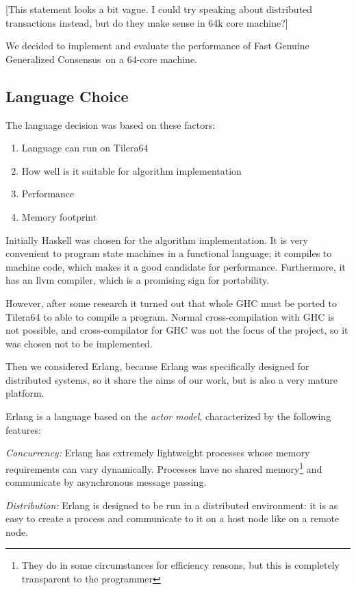 \documentclass[english,11pt]{article}
\newcommand{\fggc}{Fast Genuine Generalized Consensus\ }
\begin{document}
[This statement looks a bit vague. I could try speaking about distributed
transactions instead, but do they make sense in 64k core machine?]

We decided to implement and evaluate the performance of \fggc on a 64-core
machine.

\subsection{Language Choice}

The language decision was based on these factors:
\begin{enumerate}
    \item Language can run on Tilera64
    \item How well is it suitable for algorithm implementation
    \item Performance
    \item Memory footprint
\end{enumerate}

Initially Haskell was chosen for the algorithm implementation. It is very
convenient to program state machines in a functional language; it compiles to
machine code, which makes it a good candidate for performance. Furthermore, it
has an llvm compiler, which is a promising sign for portability.

However, after some research it turned out that whole GHC must be ported to
Tilera64 to able to compile a program. Normal cross-compilation with GHC is not
possible, and cross-compilator for GHC was not the focus of the project, so it
was chosen not to be implemented.

Then we considered Erlang, because Erlang was specifically designed for
distributed systems, so it share the aims of our work, but is also a very
mature platform.

Erlang is a language based on the  {\em actor model}, characterized by the
following features:

{\em Concurrency:} Erlang has extremely lightweight processes whose memory
requirements can vary dynamically. Processes have no shared
memory\footnote{They do in some circumstances for efficiency reasons, but this
is completely transparent to the programmer} and communicate by asynchronous
message passing. 

{\em Distribution:} Erlang is designed to be run in a distributed
environment: it is as easy to create a process and communicate to
it on a host node like on a remote node.
\end{document}
